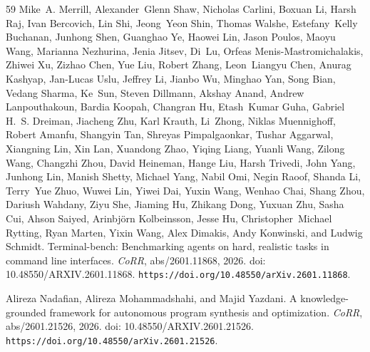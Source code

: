 \documentclass{llmxive}
\providecommand{\url}[1]{\texttt{#1}}
\providecommand{\doi}[1]{doi: #1}
\begin{document}
\begin{thebibliography}{59}
Mike~A. Merrill, Alexander~Glenn Shaw, Nicholas Carlini, Boxuan Li, Harsh Raj, Ivan Bercovich, Lin Shi, Jeong~Yeon Shin, Thomas Walshe, Estefany~Kelly Buchanan, Junhong Shen, Guanghao Ye, Haowei Lin, Jason Poulos, Maoyu Wang, Marianna Nezhurina, Jenia Jitsev, Di~Lu, Orfeas Menis{-}Mastromichalakis, Zhiwei Xu, Zizhao Chen, Yue Liu, Robert Zhang, Leon~Liangyu Chen, Anurag Kashyap, Jan{-}Lucas Uslu, Jeffrey Li, Jianbo Wu, Minghao Yan, Song Bian, Vedang Sharma, Ke~Sun, Steven Dillmann, Akshay Anand, Andrew Lanpouthakoun, Bardia Koopah, Changran Hu, Etash~Kumar Guha, Gabriel H.~S. Dreiman, Jiacheng Zhu, Karl Krauth, Li~Zhong, Niklas Muennighoff, Robert Amanfu, Shangyin Tan, Shreyas Pimpalgaonkar, Tushar Aggarwal, Xiangning Lin, Xin Lan, Xuandong Zhao, Yiqing Liang, Yuanli Wang, Zilong Wang, Changzhi Zhou, David Heineman, Hange Liu, Harsh Trivedi, John Yang, Junhong Lin, Manish Shetty, Michael Yang, Nabil Omi, Negin Raoof, Shanda Li, Terry~Yue Zhuo, Wuwei Lin, Yiwei Dai, Yuxin Wang, Wenhao Chai, Shang Zhou, Dariush
  Wahdany, Ziyu She, Jiaming Hu, Zhikang Dong, Yuxuan Zhu, Sasha Cui, Ahson Saiyed, Arinbj{\"{o}}rn Kolbeinsson, Jesse Hu, Christopher~Michael Rytting, Ryan Marten, Yixin Wang, Alex Dimakis, Andy Konwinski, and Ludwig Schmidt.
\newblock Terminal-bench: Benchmarking agents on hard, realistic tasks in command line interfaces.
\newblock \emph{CoRR}, abs/2601.11868, 2026.
\newblock \doi{10.48550/ARXIV.2601.11868}.
\newblock \url{https://doi.org/10.48550/arXiv.2601.11868}.

Alireza Nadafian, Alireza Mohammadshahi, and Majid Yazdani.
 {A} knowledge-grounded framework for autonomous program synthesis and optimization.
\newblock \emph{CoRR}, abs/2601.21526, 2026.
\newblock \doi{10.48550/ARXIV.2601.21526}.
\newblock \url{https://doi.org/10.48550/arXiv.2601.21526}.


\end{thebibliography}
\end{document}
